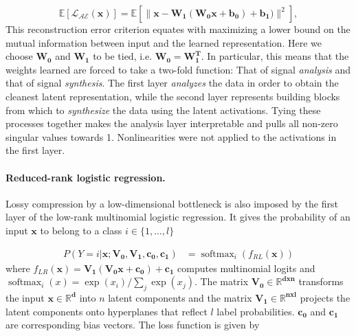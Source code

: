 \documentclass{article} %
\DeclareMathOperator{\softmax}{softmax}
\begin{document}
\begin{equation}
  \mathbb E\left[{\mathcal{L_{AE}}}(\mathbf{x})\right] = %
  \mathbb E\left[\| \mathbf{x} - \mathbf{W_1}(\mathbf{W_0}\mathbf{x} + \mathbf{b_0}) + \mathbf{b_1}) \|^2\right],
\end{equation}
This reconstruction error criterion equates with
maximizing a lower bound on the mutual information between
input and the learned representation.
Here we choose $\mathbf{W_0}$ and $\mathbf{W_1}$ to be tied, i.e.
$\mathbf{W_0} = \mathbf{W_1^T}$. In particular, this means that the weights
learned are forced to take a two-fold function: That of signal 
\textit{analysis} and that of signal \textit{synthesis}.
The first layer \textit{analyzes}
the data in order to obtain the cleanest latent representation,
while the second
layer represents building blocks from which to \textit{synthesize} the data
using the latent activations.
Tying these processes together makes the analysis
layer interpretable and pulls all non-zero singular values towards 1. 
Nonlinearities were not applied to the
activations in the first layer.

\paragraph{Reduced-rank logistic regression.}
Lossy compression by a low-dimensional bottleneck
is also imposed by the first layer of the low-rank
multinomial logistic regression.
It gives the probability of an input $\mathbf{x}$ to belong
to a class $i \in \{1, \dots, l\}$

\begin{equation}
  \begin{split}
    P(Y=i|\mathbf{x; V_0,V_1,c_0, c_1}) &= \softmax_i(f_{RL}(\mathbf x))
  \end{split}
  \label{eq:lr}
\end{equation}
where \(f_{LR}(\mathbf x) = \mathbf{V_1 (V_0 x + c_0) + c_1}\) computes 
multinomial logits and \(\softmax_i(x) = \exp(x_i)/\sum_j\exp(x_j)\).
The matrix $\mathbf{V_0 \in \mathbb{R}^{dxn}}$
transforms the input $\mathbf{x \in \mathbb{R}^{d}}$
into $n$ latent components
and the matrix $\mathbf{V_1 \in \mathbb{R}^{nxl}}$
projects the latent components
onto hyperplanes that reflect $l$ label probabilities.
$\mathbf{c_0}$ and $\mathbf{c_1}$ are corresponding
bias vectors.
The loss function is given by
\end{document}
